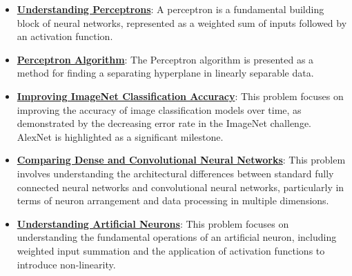 \documentclass{article}%
\begin{document}
\begin{itemize}[leftmargin=*]%
\item \href{https://purdue.brightspace.com/d2l/common/assets/pdfjs-d2l-dist/1.0.14-legacy/web/viewer.html?file=\%2Fcontent\%2Fenforced\%2F1095467-wl.202510.CS.24300.001\%2F04L1-Linear Algebra Primer.pdf\%3Fou\%3D1095467\&lang=en-us\&container=d2l-fileviewer-rendered-pdf\&fullscreen=d2l-fileviewer-rendered-pdf-dialog\&height=667#page=17}{\textbf{Understanding Perceptrons}}: A perceptron is a fundamental building block of neural networks, represented as a weighted sum of inputs followed by an activation function.%
\item \href{https://purdue.brightspace.com/d2l/common/assets/pdfjs-d2l-dist/1.0.14-legacy/web/viewer.html?file=\%2Fcontent\%2Fenforced\%2F1095467-wl.202510.CS.24300.001\%2F05L2-ML Basics.pdf\%3Fou\%3D1095467\&lang=en-us\&container=d2l-fileviewer-rendered-pdf\&fullscreen=d2l-fileviewer-rendered-pdf-dialog\&height=667#page=30}{\textbf{Perceptron Algorithm}}: The Perceptron algorithm is presented as a method for finding a separating hyperplane in linearly separable data.%
\item \href{https://purdue.brightspace.com/d2l/common/assets/pdfjs-d2l-dist/1.0.14-legacy/web/viewer.html?file=\%2Fcontent\%2Fenforced\%2F1095467-wl.202510.CS.24300.001\%2F09L1-cnn.pdf\%3Fou\%3D1095467\&lang=en-us\&container=d2l-fileviewer-rendered-pdf\&fullscreen=d2l-fileviewer-rendered-pdf-dialog\&height=667#page=3}{\textbf{Improving ImageNet Classification Accuracy}}: This problem focuses on improving the accuracy of image classification models over time, as demonstrated by the decreasing error rate in the ImageNet challenge. AlexNet is highlighted as a significant milestone.%
\item \href{https://purdue.brightspace.com/d2l/common/assets/pdfjs-d2l-dist/1.0.14-legacy/web/viewer.html?file=\%2Fcontent\%2Fenforced\%2F1095467-wl.202510.CS.24300.001\%2F09L1-cnn.pdf\%3Fou\%3D1095467\&lang=en-us\&container=d2l-fileviewer-rendered-pdf\&fullscreen=d2l-fileviewer-rendered-pdf-dialog\&height=667#page=4}{\textbf{Comparing Dense and Convolutional Neural Networks}}: This problem involves understanding the architectural differences between standard fully connected neural networks and convolutional neural networks, particularly in terms of neuron arrangement and data processing in multiple dimensions.%
\item \href{https://purdue.brightspace.com/d2l/common/assets/pdfjs-d2l-dist/1.0.14-legacy/web/viewer.html?file=\%2Fcontent\%2Fenforced\%2F1095467-wl.202510.CS.24300.001\%2F09L1-cnn.pdf\%3Fou\%3D1095467\&lang=en-us\&container=d2l-fileviewer-rendered-pdf\&fullscreen=d2l-fileviewer-rendered-pdf-dialog\&height=667#page=5}{\textbf{Understanding Artificial Neurons}}: This problem focuses on understanding the fundamental operations of an artificial neuron, including weighted input summation and the application of activation functions to introduce non-linearity.%

\end{itemize}
\end{document}
